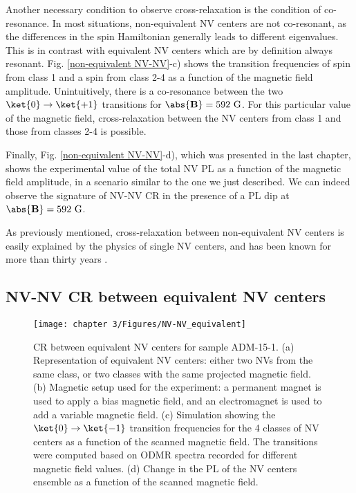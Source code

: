 \documentclass[a4paper, 11pt]{report}
\begin{document}
Another necessary condition to observe cross-relaxation is the condition of co-resonance. In most situations, non-equivalent NV centers are not co-resonant, as the differences in the spin Hamiltonian generally leads to different eigenvalues. This is in contrast with equivalent NV centers which are by definition always resonant. Fig. \ref{non-equivalent NV-NV}-c) shows the transition frequencies of spin from class 1 and a spin from class 2-4 as a function of the magnetic field amplitude. Unintuitively, there is a co-resonance between the two $\ket{0} \to \ket{+1}$ transitions for $\abs{\mathbf{B}}=592\ \rm G$. For this particular value of the magnetic field, cross-relaxation between the NV centers from class 1 and those from classes 2-4 is possible.

Finally, Fig. \ref{non-equivalent NV-NV}-d), which was presented in the last chapter, shows the experimental value of the total NV PL as a function of the magnetic field amplitude, in a scenario similar to the one we just described. We can indeed observe the signature of NV-NV CR in the presence of a PL dip at $\abs{\mathbf{B}}=592\ \rm G$.

As previously mentioned, cross-relaxation between non-equivalent NV centers is easily explained by the physics of single NV centers, and has been known for more than thirty years \citep{holliday1989optical, van1989cross}.

\subsection{NV-NV CR between equivalent NV centers}

\begin{figure}[h]
\centering
\texttt{[image: chapter 3/Figures/NV-NV\_equivalent]}
\caption{CR between equivalent NV centers for sample ADM-15-1. (a) Representation of equivalent NV centers: either two NVs from the same class, or two classes with the same projected magnetic field. (b) Magnetic setup used for the experiment: a permanent magnet is used to apply a bias magnetic field, and an electromagnet is used to add a variable magnetic field. (c) Simulation showing the $\ket{0}\to\ket{-1}$ transition frequencies for the 4 classes of NV centers as a function of the scanned magnetic field. The transitions were computed based on ODMR spectra recorded for different magnetic field values. (d) Change in the PL of the NV centers ensemble as a function of the scanned magnetic field.}
\label{equivalent NV-NV}
\end{figure}
\end{document}
